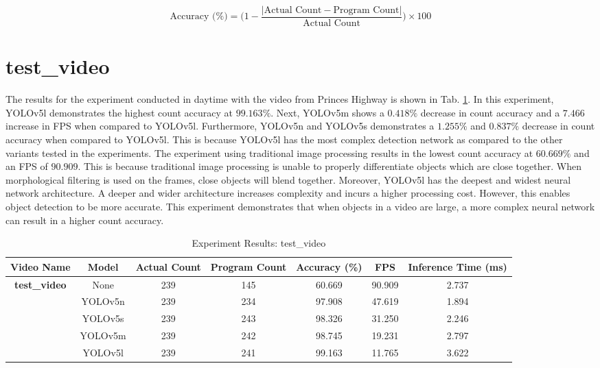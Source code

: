 \documentclass[12pt,a4paper,fleqn]{report}
\begin{document}
\begin{equation}
    \text{Accuracy (\%)} = \Big(1 - \frac{\lvert\text{Actual Count} - \text{Program
    Count}\rvert}{\text{Actual Count}}\Big)
    \times 100
    \label{eq:accuracy}
\end{equation}

\section{test\_video}

The results for the experiment conducted in daytime with the video from Princes Highway is shown in
Tab. \ref{tab:result_test_video}.
In this experiment, YOLOv5l demonstrates the highest count accuracy at $99.163\%$.
Next, YOLOv5m shows a $0.418\%$ decrease in count accuracy and a $7.466$ increase in FPS when compared
to YOLOv5l.
Furthermore, YOLOv5n and YOLOv5s demonstrates a $1.255\%$ and $0.837\%$ decrease in count accuracy when
compared to YOLOv5l.
This is because YOLOv5l has the most complex detection network as compared to the other variants
tested in the experiments.
The experiment using traditional image processing results in the lowest count accuracy at
$60.669\%$ and an FPS of $90.909$.
This is because traditional image processing is unable to properly differentiate objects which are
close together.
When morphological filtering is used on the frames, close objects will blend together.
Moreover, YOLOv5l has the deepest and widest neural network architecture.
A deeper and wider architecture increases complexity and incurs a higher processing cost.
However, this enables object detection to be more accurate.
This experiment demonstrates that when objects in a video are large, a more complex neural network
can result in a higher count accuracy.

\begin{table}[htbp]
    \centering
    \begin{adjustbox}{width=1\textwidth}
    \begin{tabular}{|c|c|c|c|c|c|c|}
    \hline
    \textbf{Video Name} & \textbf{Model} & \textbf{Actual Count} & \textbf{Program Count} & \textbf{Accuracy (\%)} & \textbf{FPS} & \textbf{Inference Time (ms)} \\ \hline
    \multirow{5}{*}{\textbf{test\_video}} & None & 239 & 145 & 60.669 & 90.909 & 2.737 \\ \cline{2-7}
     & YOLOv5n & 239 & 234 & 97.908 & 47.619 & 1.894 \\ \cline{2-7}
     & YOLOv5s & 239 & 243 & 98.326 & 31.250 & 2.246 \\ \cline{2-7}
     & YOLOv5m & 239 & 242 & 98.745 & 19.231 & 2.797 \\ \cline{2-7}
     & YOLOv5l & 239 & 241 & 99.163 & 11.765 & 3.622 \\ \hline
    \end{tabular}
    \end{adjustbox}
    \caption{Experiment Results: test\_video}
    \label{tab:result_test_video}
\end{table}
\end{document}
